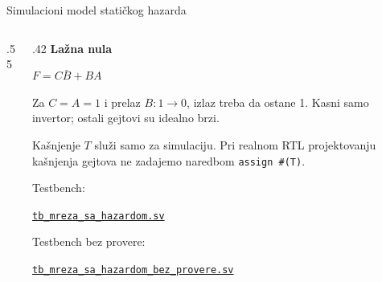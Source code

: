 \begin{frame}[label=02-s051-rtl01]{Simulacioni model statičkog hazarda}
\setlength{\parskip}{0pt}

\begin{columns}[T,onlytextwidth]
\begin{column}{.55\textwidth}

\end{column}
\begin{column}{.42\textwidth}
\fontsize{10}{12}\selectfont
\textbf{Lažna nula}\par\vspace{2mm}
\(F=C\bar B+BA\)\par\vspace{2mm}
Za \(C=A=1\) i prelaz \(B:1\to0\), izlaz treba da ostane 1. Kasni samo invertor; ostali gejtovi su idealno brzi.\par\vspace{2mm}
{\fontsize{9}{11}\selectfont
\alert{Kašnjenje \(T\) služi samo za simulaciju.} Pri realnom RTL projektovanju kašnjenja gejtova ne zadajemo naredbom \texttt{assign \#(T)}.\par}
\par\vspace{2mm}
{\fontsize{9}{11}\selectfont
Testbench:\par
\href{https://github.com/pznikola/digitalna_elektronika_1/blob/main/predavanja/02_sinteza_kombinacionih_mreza/kodovi/primeri_sv/02-s051/tb_mreza_sa_hazardom.sv}{\texttt{tb\_mreza\_sa\_hazardom.sv}}\par
Testbench bez provere:\par
\href{https://github.com/pznikola/digitalna_elektronika_1/blob/main/predavanja/02_sinteza_kombinacionih_mreza/kodovi/primeri_sv/02-s051/tb_mreza_sa_hazardom_bez_provere.sv}{\texttt{tb\_mreza\_sa\_hazardom\_bez\_provere.sv}}\par}
\end{column}
\end{columns}
\end{frame}

